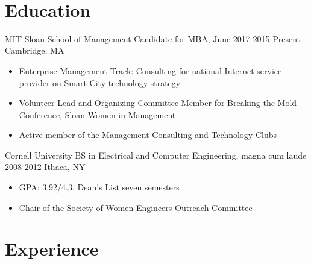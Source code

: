 \documentclass[a4paper,11pt]{business}
\begin{document}

\\




\section{Education}

\entry
 {MIT Sloan School of Management}
 {Candidate for MBA, June 2017}
 {2015}
 {Present}
 {Cambridge, MA}{
 \begin{itemize}
  \item Enterprise Management Track: Consulting for national Internet service provider on Smart City technology strategy
  \item Volunteer Lead and Organizing Committee Member for Breaking the Mold Conference, Sloan Women in Management
  \item Active member of the Management Consulting and Technology Clubs
 \end{itemize}
}

\entry
 {Cornell University}
 {BS in Electrical and Computer Engineering, magna cum laude}
 {2008}
 {2012}
 {Ithaca, NY}{
 \begin{itemize}
  \item GPA: 3.92/4.3, Dean's List seven semesters
  \item Chair of the Society of Women Engineers Outreach Committee
 \end{itemize}
}


\section{Experience}
\end{document}
